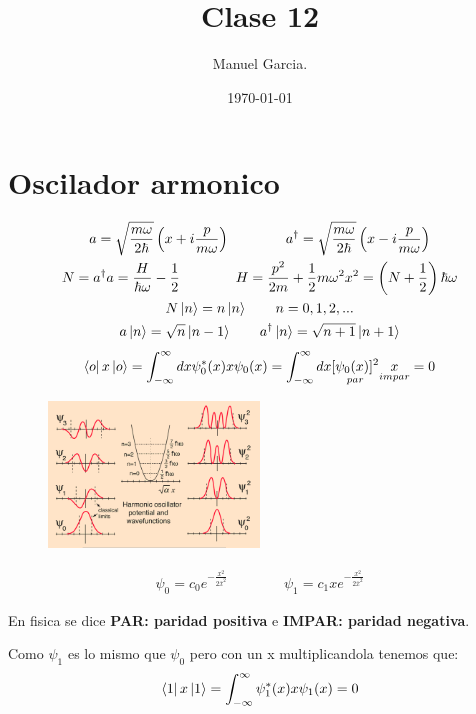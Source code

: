 \documentclass{article}
\title{Clase 12 }
\author{Manuel Garcia.}
\date{\today}
\begin{document}
\maketitle

\section{Oscilador armonico }
\begin{gather*}
  a = \sqrt{\frac{m \omega}{2 \hbar }} \left(x + i \frac{p }{m \omega}\right) \qquad \qquad a ^ {\dag } = \sqrt{\frac{m \omega }{2 \hbar }} \left(x - i \frac{p }{m \omega}\right) \\
  N = a ^ {\dag } a = \frac{H }{\hbar  \omega }- \frac{1}{2} \qquad \qquad H = \frac{p ^2}{2m } + \frac{1}{2}m \omega ^2 x ^2 = \left(N + \frac{1}{2}\right)\hbar \omega\\
  N \ket{n } =  n \ket{n } \qquad n = 0,1,2,...\\
  a \ket{n } =  \sqrt{n } \ket{n -1 }\qquad a ^ {\dag } \ket{n } = \sqrt{n + 1 } \ket{n + 1 }
\end{gather*}
\begin{gather*}
  \bra{o }x \ket{o } = \int_{-\infty}^{\infty} dx \psi_0^*(x) x \psi_0 (x)  = \int_{- \infty}^{\infty}dx \underset{par }{[\psi_0(x)]^2} \underset{impar }{x}  = 0 
\end{gather*}

\begin{figure}[H]
  \begin{center}
    \includegraphics[width=0.5\textwidth]{wave_function.png}
  \end{center}
\end{figure}
\begin{gather*}
  \psi_0 = c_0 e ^ {- \frac{x ^2}{2 \bar x ^2}} \qquad \qquad \psi_1 = c_1 x e ^ {- \frac{x ^2 }{2 \bar x ^2}}
\end{gather*}

En fisica se dice \textbf{PAR: paridad positiva } e \textbf{IMPAR: paridad negativa}.

Como $ \psi_1  $ es lo mismo que $ \psi_0  $ pero con un x multiplicandola tenemos que: 
\begin{gather*}
  \bra{1 }x \ket{1 } = \int_{-\infty}^{\infty}\psi_1^* (x) x \psi_1(x)= 0   
\end{gather*}
\end{document}
